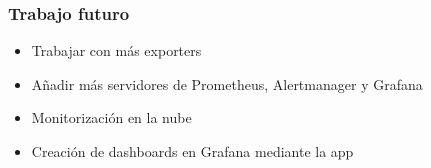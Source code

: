 \begin{frame}[label=trabajo_futuro]
    \frametitle{Trabajo futuro}
    \begin{itemize}
        \item Trabajar con más exporters
        \item Añadir más servidores de Prometheus, Alertmanager y Grafana
        \item Monitorización en la nube
        \item Creación de dashboards en Grafana mediante la app
    \end{itemize}
    
\end{frame}